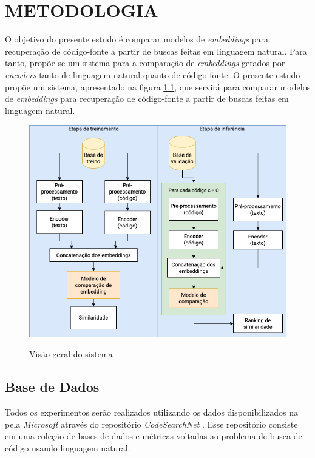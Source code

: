 \chapter{METODOLOGIA}
\label{chp:methodology}
\graphicspath{ {./resources/images/metodologia} }

O objetivo do presente estudo é comparar modelos de \textit{embeddings} para recuperação de código-fonte a partir de buscas feitas em linguagem natural. Para tanto, propõe-se um sistema para a comparação de \textit{embeddings} gerados por \textit{encoders} tanto de linguagem natural quanto de código-fonte.
O presente estudo propõe um sistema, apresentado na figura \ref{fig:metodology-system_overview}, que servirá para comparar modelos de \textit{embeddings} para recuperação de código-fonte a partir de buscas feitas em linguagem natural.

\begin{figure}[htbp]
    \centering
        \caption{Visão geral do sistema}
        \includegraphics[scale=0.5]{system-overview.png}
        \label{fig:metodology-system_overview}
\end{figure}

\section{Base de Dados}
Todos os experimentos serão realizados utilizando os dados disponibilizados na pela \textit{Microsoft} através do repositório \textit{CodeSearchNet} \cite{Husain2019CodeSearchNetCE}. Esse repositório consiste em uma coleção de bases de dados e métricas voltadas ao problema de busca de código usando linguagem natural.


